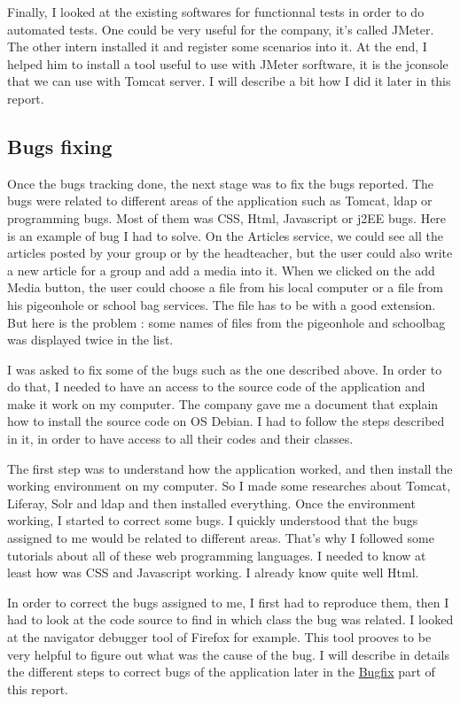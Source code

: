 Finally, I looked at the existing softwares for functionnal tests in order to do automated 
tests. One could be very useful for the company, it's called JMeter. The other intern 
installed it and register some scenarios into it. At the end, I helped him to install
a tool useful to use with JMeter sorftware, it is the jconsole that we can use with Tomcat
server. I will describe a bit how I did it later in this report. 



\newpage
\subsection{Bugs fixing}
Once the bugs tracking done, the next stage was to fix the bugs reported. 
The bugs were related to different areas of the application
such as Tomcat, ldap or programming bugs. Most of them was CSS, Html, Javascript or j2EE
bugs. Here is an example of bug I had to solve. On the Articles service, we could see
all the articles posted by your group or by the headteacher, but the user could also
write a new article for a group and add a media into it. 
When we clicked on the add Media button, 
the user could choose a file from his local computer or a file from his pigeonhole or school
bag services. 
The file has to be with a good extension. But here is the problem : some names of files
from the pigeonhole and schoolbag was displayed twice in the list.  

I was asked to fix some of the bugs such as the one described above. 
In order to do that, I needed to have an access to the source code of the application
 and make it work on my computer.
The company gave me a document that explain how to install the source code on OS Debian. 
I had to follow the steps described in it, in order to have access to all their codes 
and their classes.

The first step was to understand how the application worked, and then install the working 
environment on my computer. 
So I made some researches about Tomcat, Liferay, Solr and ldap and then installed everything. 
Once the environment working, I started to correct some bugs. I quickly understood that
the bugs assigned to me would be related to different areas.  
That's why I followed some tutorials about all of these web programming languages. I 
needed to know at least how was CSS and Javascript working. I already know quite well
Html.  

In order to correct the bugs assigned to me, I first had to reproduce them, then I had
to look at the code source to find in which class the bug was related. I looked at 
the navigator debugger tool of Firefox for example. This tool prooves to be very helpful 
to figure out what was the cause of the bug. I will describe in details
the different steps to correct bugs of the application later in the   
\hyperlink{ancre}{Bugfix} part of this report.
